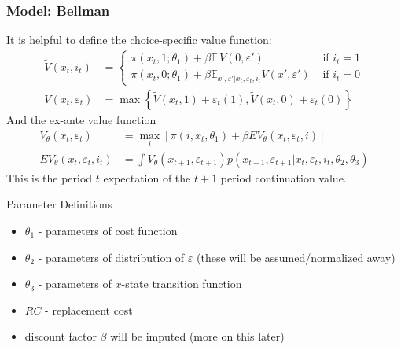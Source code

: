 \documentclass[xcolor=pdftex,dvipsnames,table,mathserif,aspectratio=169]{beamer}
\begin{document}


\begin{frame}
\frametitle{Model: Bellman}
It is helpful to define the \alert{choice-specific value function}:
\begin{align*}
\tilde V (x_t, i_t) &= \left \{ 
\begin{array}{lr}
 \pi(x_t, 1;\theta_1) + \beta \mathbb{E}\, V(0, \varepsilon ')  & \text{ if } i_t = 1 \\
 \pi(x_t , 0; \theta_1) + \beta \mathbb{E}_{x', \varepsilon ' | x_t, \varepsilon_t, i_t} V(x', \varepsilon ')   & \text{ if } i_t = 0
\end{array}
\right .\\
V(x_t,\varepsilon_t) &= \max \left\{ 
\tilde V (x_t, 1) + \varepsilon_{t}(1),
\tilde V(x_t, 0) + \varepsilon_{t}(0) 
\right\}
\end{align*}
And the \alert{ex-ante value function}
 \begin{align*}
		V_{\theta}\left(x_{t},\varepsilon_{t}\right) &= \max_{i} \left[ \pi \left(i,x_{t},\theta_1 \right) +
		\beta EV_{\theta}\left(x_{t},\varepsilon_{t},i \right) \right]\\
	 EV_{\theta}\left(x_{t},\varepsilon_{t},i_{t}\right) &=\int V_{\theta}\left(x_{t+1},\varepsilon_{t+1}\right) p\left(x_{t+1}, \varepsilon_{t+1} |x_{t},\varepsilon_{t},i_{t},\theta_{2},\theta_{3}\right)
\end{align*}
This is the period $t$ expectation of the $t+1$ period continuation value.

\end{frame}



\begin{frame}{Parameter Definitions}
\begin{itemize}
	\item $\theta_{1}$ - parameters of cost function
	\item $\theta_{2}$ - parameters of distribution of $\varepsilon$ (these will be assumed/normalized away)
	\item $\theta_{3}$ - parameters of $x$-state transition function
	\item $RC$ - replacement cost
	\item discount factor $\beta$ will be imputed (more on this later)
\end{itemize}

\end{frame}
\end{document}
